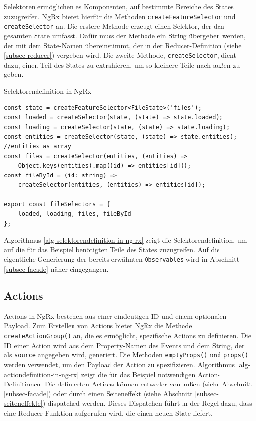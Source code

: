\documentclass[12pt]{book}          %
\begin{document}
Selektoren ermöglichen es Komponenten, auf bestimmte Bereiche des States zuzugreifen. NgRx bietet hierfür die Methoden \texttt{createFeatureSelector} und \texttt{createSelector} an. Die erstere Methode erzeugt einen Selektor, der den gesamten State umfasst. Dafür muss der Methode ein String übergeben werden, der mit dem State-Namen übereinstimmt, der in der Reducer-Definition (siehe \ref{subsec-reducer}) vergeben wird. Die zweite Methode, \texttt{createSelector}, dient dazu, einen Teil des States zu extrahieren, um so kleinere Teile nach außen zu geben.

\begin{algorithm}
\caption{Selektorendefinition in NgRx}
\label{alg-selektorendefinition-in-ng-rx}
\begin{lstlisting}
const state = createFeatureSelector<FileState>('files');
const loaded = createSelector(state, (state) => state.loaded);
const loading = createSelector(state, (state) => state.loading);
const entities = createSelector(state, (state) => state.entities);
//entities as array
const files = createSelector(entities, (entities) => 
    Object.keys(entities).map((id) => entities[id]));
const fileById = (id: string) =>  
    createSelector(entities, (entities) => entities[id]);

export const fileSelectors = {
    loaded, loading, files, fileById
};
\end{lstlisting}
\end{algorithm}

Algorithmus \ref{alg-selektorendefinition-in-ng-rx} zeigt die Selektorendefinition, um auf die für das Beispiel benötigten Teile des States zuzugreifen. Auf die eigentliche Generierung der bereits erwähnten \texttt{Observables} wird in Abschnitt \ref{subsec-facade} näher eingegangen.

\subsection{Actions}
\label{subsec-actions}

Actions in NgRx bestehen aus einer eindeutigen ID und einem optionalen Payload. Zum Erstellen von Actions bietet NgRx die Methode \texttt{createActionGroup()} an, die es ermöglicht, spezifische Actions zu definieren. Die ID einer Action wird aus dem Property-Namen des Events und dem String, der als \texttt{source} angegeben wird, generiert. Die Methoden \texttt{emptyProps()} und \texttt{props()} werden verwendet, um den Payload der Action zu spezifizieren. Algorithmus \ref{alg-actiondefinition-in-ng-rx} zeigt die für das Beispiel notwendigen Action-Definitionen. Die definierten Actions können entweder von außen (siehe Abschnitt \ref{subsec-facade}) oder durch einen Seiteneffekt (siehe Abschnitt \ref{subsec-seiteneffekte}) dispatched werden. Dieses Dispatchen führt in der Regel dazu, dass eine Reducer-Funktion aufgerufen wird, die einen neuen State liefert.
\end{document}
